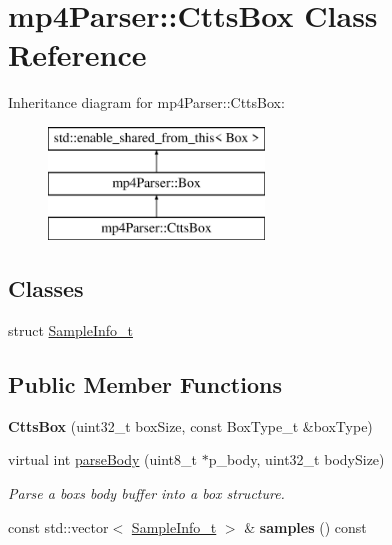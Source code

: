 \hypertarget{classmp4_parser_1_1_ctts_box}{}\section{mp4\+Parser\+::Ctts\+Box Class Reference}
\label{classmp4_parser_1_1_ctts_box}
Inheritance diagram for mp4\+Parser\+::Ctts\+Box\+:\begin{figure}[H]
\begin{center}
\leavevmode
\includegraphics[height=3.000000cm]{classmp4_parser_1_1_ctts_box}
\end{center}
\end{figure}
\subsection*{Classes}
\begin{DoxyCompactItemize}
\item 
struct \mbox{\hyperlink{structmp4_parser_1_1_ctts_box_1_1_sample_info__t}{Sample\+Info\+\_\+t}}
\end{DoxyCompactItemize}
\subsection*{Public Member Functions}
\begin{DoxyCompactItemize}
\item 
\mbox{\label{classmp4_parser_1_1_ctts_box_a39cbd1626d4a6f1c4ca2324dd5ac7c95}} 
{\bfseries Ctts\+Box} (uint32\+\_\+t box\+Size, const Box\+Type\+\_\+t \&box\+Type)
\item 
virtual int \mbox{\hyperlink{classmp4_parser_1_1_ctts_box_a5fe22fc963e1a4bf8268d314367fc691}{parse\+Body}} (uint8\+\_\+t $\ast$p\+\_\+body, uint32\+\_\+t body\+Size)
\begin{DoxyCompactList}\small\item\em Parse a box\textquotesingle{}s body buffer into a box structure. \end{DoxyCompactList}\item 
\mbox{\label{classmp4_parser_1_1_ctts_box_a470f404d256e8b417e37b5e72d8a0cb9}} 
const std\+::vector$<$ \mbox{\hyperlink{structmp4_parser_1_1_ctts_box_1_1_sample_info__t}{Sample\+Info\+\_\+t}} $>$ \& {\bfseries samples} () const
\end{DoxyCompactItemize}
